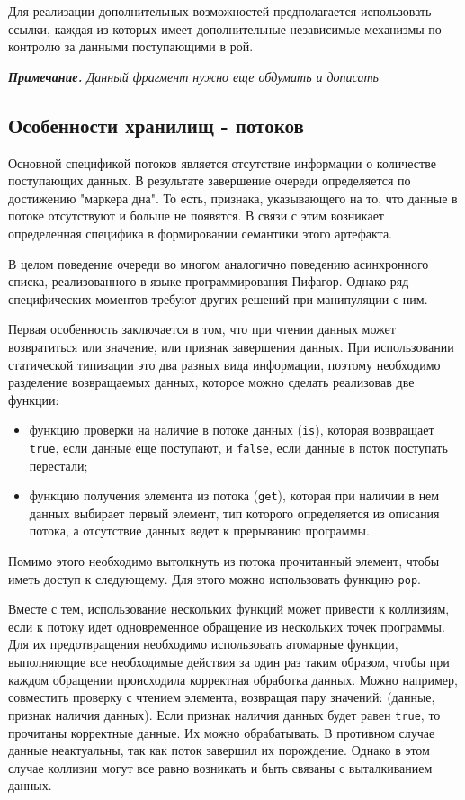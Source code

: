 Для реализации дополнительных возможностей предполагается использовать ссылки, каждая из которых имеет дополнительные независимые механизмы по контролю за данными поступающими в рой.

\textit{\textbf{Примечание.}
Данный фрагмент нужно еще обдумать и дописать}

\subsection{Особенности хранилищ - потоков}

Основной спецификой потоков является отсутствие информации о количестве поступающих данных. В результате завершение очереди определяется по достижению "маркера дна". То есть, признака, указывающего на то, что данные в потоке отсутствуют и больше не появятся. В связи с этим возникает определенная специфика в формировании семантики этого артефакта.

В целом поведение очереди во многом аналогично поведению асинхронного списка, реализованного в языке программирования Пифагор. Однако ряд специфических моментов требуют других решений при манипуляции с ним.

Первая особенность заключается в том, что при чтении данных может возвратиться или значение, или признак завершения данных. При использовании статической типизации это два разных вида информации, поэтому необходимо разделение возвращаемых данных, которое можно сделать реализовав две функции:
\begin{itemize}
    \item функцию проверки на наличие в потоке данных (\verb|is|), которая возвращает \verb|true|, если данные еще поступают, и \verb|false|, если данные в поток поступать перестали;
    \item функцию получения элемента из потока (\verb|get|), которая при наличии в нем данных выбирает первый элемент, тип которого определяется из описания потока, а отсутствие данных ведет к прерыванию программы.
\end{itemize}

Помимо этого необходимо вытолкнуть из потока прочитанный элемент, чтобы иметь доступ к следующему. Для этого можно использовать функцию \verb|pop|.

Вместе с тем, использование нескольких функций может привести к коллизиям, если к потоку идет одновременное обращение из нескольких точек программы. Для их предотвращения необходимо использовать атомарные функции, выполняющие все необходимые действия за один раз таким образом, чтобы при каждом обращении происходила корректная обработка данных. Можно например, совместить проверку с чтением элемента, возвращая пару значений: (данные, признак наличия данных). Если признак наличия данных будет равен \verb|true|, то прочитаны корректные данные. Их можно обрабатывать. В противном случае данные неактуальны, так как поток завершил их порождение. Однако в этом случае коллизии могут все равно возникать и быть связаны с выталкиванием данных.

